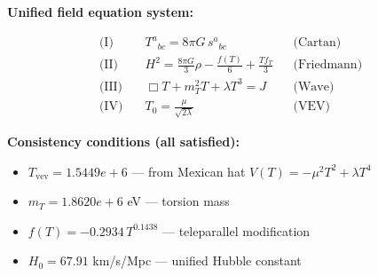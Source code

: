 
\textbf{Unified field equation system:}

\begin{align}
  \text{(I)} \quad & T^a{}_{bc} = 8\pi G \, s^a{}_{bc} && \text{(Cartan)} \\
  \text{(II)} \quad & H^2 = \frac{8\pi G}{3}\rho - \frac{f(T)}{6} + \frac{Tf_T}{3} && \text{(Friedmann)} \\
  \text{(III)} \quad & \Box T + m_T^2 T + \lambda T^3 = J && \text{(Wave)} \\
  \text{(IV)} \quad & T_0 = \frac{\mu}{\sqrt{2\lambda}} && \text{(VEV)}
\end{align}

\textbf{Consistency conditions (all satisfied):}
\begin{itemize}
  \item $T_{\text{vev}} = 1.5449e+6$ — from Mexican hat $V(T) = -\mu^2 T^2 + \lambda T^4$
  \item $m_T = 1.8620e+6$ eV — torsion mass
  \item $f(T) = -0.2934 \, T^{0.1438}$ — teleparallel modification
  \item $H_0 = 67.91$ km/s/Mpc — unified Hubble constant
\end{itemize}